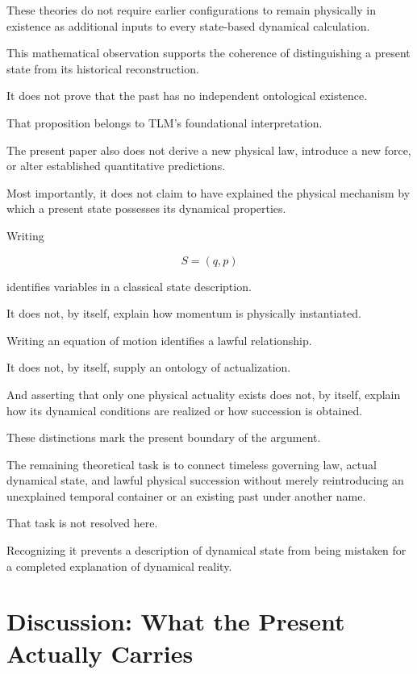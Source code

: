 \documentclass[12pt,onecolumn]{article}
\begin{document}
These theories do not require earlier configurations to remain physically in existence as additional inputs to every state-based dynamical calculation.

This mathematical observation supports the coherence of distinguishing a present state from its historical reconstruction.

It does not prove that the past has no independent ontological existence.

That proposition belongs to TLM's foundational interpretation.

The present paper also does not derive a new physical law, introduce a new force, or alter established quantitative predictions.

Most importantly, it does not claim to have explained the physical mechanism by which a present state possesses its dynamical properties.

Writing

\begin{equation}
S=(q,p)
\end{equation}

identifies variables in a classical state description.

It does not, by itself, explain how momentum is physically instantiated.

Writing an equation of motion identifies a lawful relationship.

It does not, by itself, supply an ontology of actualization.

And asserting that only one physical actuality exists does not, by itself, explain how its dynamical conditions are realized or how succession is obtained.

These distinctions mark the present boundary of the argument.

The remaining theoretical task is to connect timeless governing law, actual dynamical state, and lawful physical succession without merely reintroducing an unexplained temporal container or an existing past under another name.

That task is not resolved here.

Recognizing it prevents a description of dynamical state from being mistaken for a completed explanation of dynamical reality.


\section{Discussion: What the Present Actually Carries}
\end{document}
